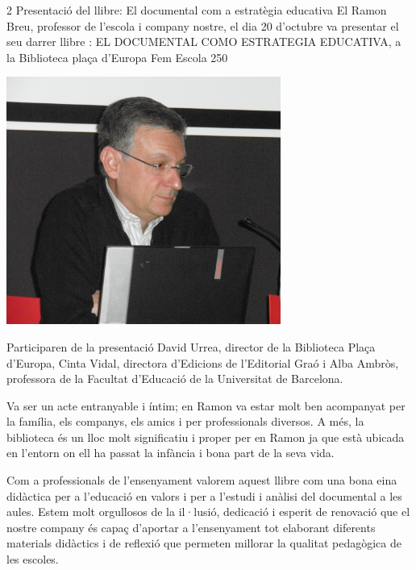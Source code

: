 \begin{news}
{2} %
{Presentació del llibre: El documental com a estratègia educativa}
{El Ramon Breu, professor  de l’escola i company nostre, el dia 20 d’octubre va presentar el seu darrer llibre : EL DOCUMENTAL COMO ESTRATEGIA EDUCATIVA, a la Biblioteca plaça d'Europa}
{Fem Escola}
{250} %

\noindent\includegraphics[width=9cm,keepaspectratio]{fem_escola/img/llibre_PA200015b.jpg}


Participaren de la presentació  David Urrea, director de la Biblioteca Plaça d'Europa, Cinta Vidal, directora d'Edicions de l'Editorial Graó i Alba Ambròs, professora de la Facultat d'Educació de la Universitat de Barcelona.

Va ser un acte entranyable i íntim;  en Ramon va estar molt ben acompanyat per la família, els companys, els  amics i per professionals diversos. 
A més, la biblioteca és un lloc molt significatiu i proper per en Ramon ja que està ubicada en  l’entorn on ell ha passat la infància i bona part de la seva vida.

Com a professionals de l’ensenyament valorem aquest llibre com una bona eina didàctica per a l’educació en valors i per a l’estudi i anàlisi del documental a les aules. Estem molt orgullosos de la il·lusió, dedicació i esperit de renovació que el nostre company és capaç d’aportar a l’ensenyament tot elaborant diferents materials didàctics i de reflexió que permeten millorar la qualitat pedagògica de les escoles. 


\end{news}
